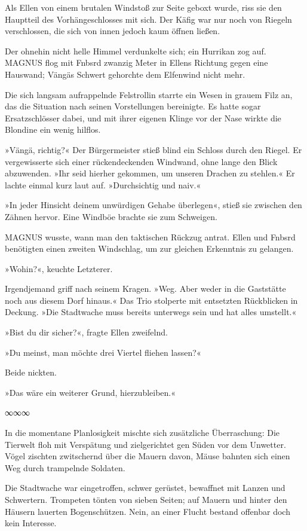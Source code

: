 Als Ellen von einem brutalen Windstoß zur Seite geboxt wurde, riss sie den Hauptteil des Vorhängeschlosses mit sich. Der Käfig war nur noch von Riegeln verschlossen, die sich von innen jedoch kaum öffnen ließen.

Der ohnehin nicht helle Himmel verdunkelte sich; ein Hurrikan zog auf. MAGNUS flog mit Fnbsrd zwanzig Meter in Ellens Richtung gegen eine Hauswand; Vängäs Schwert gehorchte dem Elfenwind nicht mehr.

Die sich langsam aufrappelnde Felstrollin starrte ein Wesen in grauem Filz an, das die Situation nach seinen Vorstellungen bereinigte. Es hatte sogar Ersatzschlösser dabei, und mit ihrer eigenen Klinge vor der Nase wirkte die Blondine ein wenig hilflos.

»Vängä, richtig?« Der Bürgermeister stieß blind ein Schloss durch den Riegel. Er vergewisserte sich einer rückendeckenden Windwand, ohne lange den Blick abzuwenden. »Ihr seid hierher gekommen, um unseren Drachen zu stehlen.« Er lachte einmal kurz laut auf. »Durchsichtig und naiv.«

»In jeder Hinsicht deinem unwürdigen Gehabe überlegen«, stieß sie zwischen den Zähnen hervor. Eine Windböe brachte sie zum Schweigen.

MAGNUS wusste, wann man den taktischen Rückzug antrat. Ellen und Fnbsrd benötigten einen zweiten Windschlag, um zur gleichen Erkenntnis zu gelangen.

»Wohin?«, keuchte Letzterer.

Irgendjemand griff nach seinem Kragen. »Weg. Aber weder in die Gaststätte noch aus diesem Dorf hinaus.« Das Trio stolperte mit entsetzten Rückblicken in Deckung. »Die Stadtwache muss bereits unterwegs sein und hat alles umstellt.«

»Bist du dir sicher?«, fragte Ellen zweifelnd.

»Du meinst, man möchte drei Viertel fliehen lassen?«

Beide nickten.

»Das wäre ein weiterer Grund, hierzubleiben.«

\begin{center}
∞∞∞
\end{center}

In die momentane Planlosigkeit mischte sich zusätzliche Überraschung: Die Tierwelt floh mit Verspätung und zielgerichtet gen Süden vor dem Unwetter. Vögel zischten zwitschernd über die Mauern davon, Mäuse bahnten sich einen Weg durch trampelnde Soldaten.

Die Stadtwache war eingetroffen, schwer gerüstet, bewaffnet mit Lanzen und Schwertern. Trompeten tönten von sieben Seiten; auf Mauern und hinter den Häusern lauerten Bogenschützen. Nein, an einer Flucht bestand offenbar doch kein Interesse.



